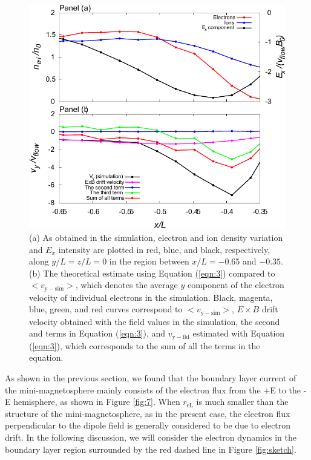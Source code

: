 \documentclass[draft,jgrga]{agutex2015}
\begin{document}
\begin{article}
\begin{figure}
\noindent\includegraphics[width=15cm]{./figures/Fig_8_bb-crop.pdf}
\caption{
(a) As obtained in the simulation, electron and ion density variation and $E_x$ intensity 
are plotted in red, blue, and black, respectively, 
along $y/L=z/L=0$ in the region between $x/L = -0.65$ and $-0.35$. 
(b) The theoretical estimate using Equation (\ref{eqn:3}) compared to 
$<v_\mathrm{y-sim}>$, which denotes the average $y$ component of the electron velocity 
of individual electrons in the simulation.
Black, magenta, blue, green, and red curves correspond to $<v_\mathrm{y-sim}>$, $E \times B$ drift velocity obtained with the field values in the simulation, 
the second and terms in Equation (\ref{eqn:3}), and 
$v_\mathrm{y-fld}$ estimated with Equation (\ref{eqn:3}), which corresponds to
the sum of all the terms in the equation.
}
\label{fig:8}
\end{figure}
As shown in the previous section, 
we found that the boundary layer current of the mini-magnetosphere 
mainly consists of the electron flux from the +E to the -E hemisphere,
as shown in Figure \ref{fig:7}. 
When $r_\mathrm{eL}$ is much smaller than the structure of the
mini-magnetosphere, as in the present case,
the electron flux perpendicular to the dipole field is 
generally considered to be due to electron drift.
In the following discussion, we will consider the electron dynamics in the boundary layer
region surrounded by
the red dashed line in Figure \ref{fig:sketch}.


\end{article}
\end{document}
